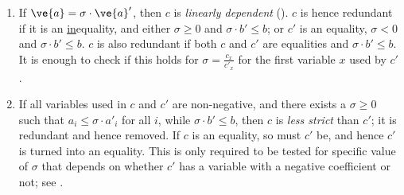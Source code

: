 \begin{enumerate} \itemsep0em
\setcounter{enumi}{\value{counterName}}
\item 
If $\ve{a}=\sigma\cdot \ve{a}'$, then $c$ is \emph{linearly dependent} (\cite{lassez93}). $c$ is hence redundant if
it is an \underline{in}equality, and either $\sigma\geq 0$ and $\sigma\cdot b'\leq b$; or $c'$ is an equality, $\sigma<0$ and $\sigma\cdot b'\leq b$. $c$ is also redundant if both $c$ and $c'$ are equalities and $\sigma\cdot b'\leq b$. 
It is enough to check if this holds for $\sigma = \frac{c_x}{c'_x}$ for the first variable $x$ used by $c'$.
\item
If all variables used in $c$ and $c'$ are non-negative, and there exists a $\sigma\geq 0$ such that $a_i \leq \sigma \cdot a'_i$ for all $i$, while $\sigma\cdot b' \leq b$, then $c$ is \emph{less strict} than $c'$; it is redundant and hence removed. If $c$ is an equality, so must $c'$ be, and hence $c'$ is turned into an equality. 
This is only required to be tested for specific value of $\sigma$ that depends on whether $c'$ has a variable with a negative coefficient or not; see \cite{MyTechRep}.
\end{enumerate} 